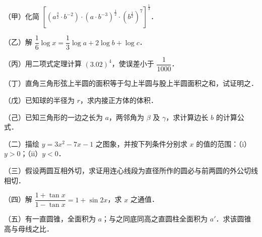 

\par\medskip


\begin{question}
（甲）化简 $\left[\left(a^{\frac32}\cdot b^{-2}\right)\cdot\left(a\cdot b^{-3}\right)^{\frac12}\cdot\left(b^{\frac12}\right)^7\right]^{\frac13}$．

\end{question}
\begin{question}
（乙）解 $\dfrac16\log x=\dfrac13\log a+2\log b+\log c$．

\end{question}
\begin{question}
（丙）用二项式定理计算 $(3.02)^4$，使误差小于 $\dfrac1{1000}$．

\end{question}
\begin{question}
（丁）直角三角形弦上半圆的面积等于勾上半圆与股上半圆面积之和，试证明之．

\end{question}
\begin{question}
（戊）已知球的半径为 $r$，求内接正方体的体积．

\end{question}
\begin{question}
（己）已知三角形的一边之长为 $a$，两邻角为 $\beta$ 及 $\gamma$，求计算边长 $b$ 的计算公式．

\par\medskip

\end{question}

\begin{question}
（二）描绘 $y=3x^2-7x-1$ 之图象，并按下列条件分别求 $x$ 的值的范围：（i）$y>0$；（ii）$y<0$．

\end{question}
\begin{question}
（三）假设两圆互相外切，求证用连心线段为直径所作的圆必与前两圆的外公切线相切．

\end{question}
\begin{question}
（四）解 $\dfrac{1+\tan x}{1-\tan x}=1+\sin2x$，求 $x$ 之通值．

\end{question}
\begin{question}
（五）有一直圆锥，全面积为 $a$；与之同底同高之直圆柱全面积为 $a'$．求该圆锥高与母线之比．

\end{question}